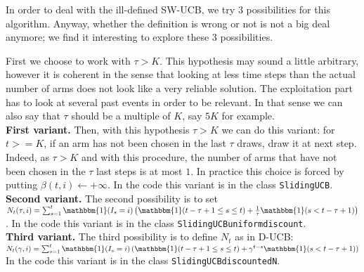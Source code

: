 In order to deal with the ill-defined SW-UCB, we try $3$ possibilities for this algorithm. Anyway, whether the definition is wrong or not is not a big deal anymore; we find it interesting to explore these $3$ possibilities.

First we choose to work with $\tau > K$. This hypothesis may sound a little arbitrary, however it is coherent in the sense that looking at less time steps than the actual number of arms does not look like a very reliable solution. The exploitation part has to look at several past events in order to be relevant. In that sense we can also say that $\tau$ should be a multiple of $K$, say $5K$ for example. \\

\textbf{First variant.} Then, with this hypothesis $\tau > K$ we can do this variant: for $t >= K$, if an arm has not been chosen in the last $\tau$ draws, draw it at next step. Indeed, as $\tau > K$ and with this procedure, the number of arms that have not been chosen in the $\tau$ last steps is at most $1$. In practice this choice is forced by putting $\beta(t,i)\leftarrow+\infty$. In the code this variant is in the class \texttt{SlidingUCB}.\\

\textbf{Second variant.} The second possibility is to set \\
$N_t(\tau,i)=\sum_{s=1}^t \mathbbm{1}(I_s=i)
	\left(
		\mathbbm{1}(t-\tau+1 \leq s \leq t)
		+ \frac{1}{\tau} \mathbbm{1}(s < t-\tau+1)
	\right)$.
In the code this variant is in the class \texttt{SlidingUCB\textunderscore uniform\textunderscore discount}.\\

\textbf{Third variant.} The third possibility is to define $N_t$ as in D-UCB:\\
$N_t(\gamma, i) = \sum_{s=1}^t \mathbbm{1}(I_s=i)
	\left(
	\mathbbm{1}(t-\tau+1 \leq s \leq t)
	+ \gamma^{t-s}\mathbbm{1}(s < t-\tau+1)
	\right)$
In the code this variant is in the class \texttt{SlidingUCB\textunderscore discountedN}.